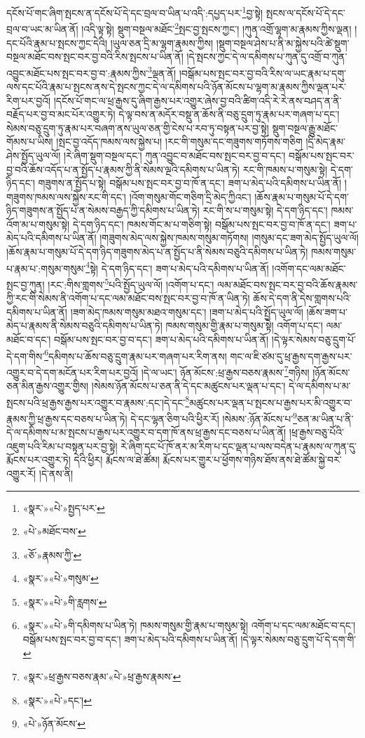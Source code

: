 དངོས་པོ་གང་ཞིག་སྤངས་ན་དངོས་པོ་དེ་དང་བྲལ་བ་ཡིན་པ་འདི་:དཔྱད་པར་\footnote{«སྣར་»«པེ་»སྤྱད་པར་}བྱ་སྟེ། སྤངས་ལ་དངོས་པོ་དེ་དང་བྲལ་བ་ཡང་མ་ཡིན་ནོ། །འདི་ལྟ་སྟེ། སྡུག་བསྔལ་མཐོང་\footnote{«པེ་»མཐོང་བས་}སྤང་བྱ་སྤངས་ཀྱང་། །ཀུན་འགྲོ་ལྷག་མ་རྣམས་ཀྱིས་ལྡན། །དང་པོའི་རྣམ་པ་སྤངས་ཀྱང་དེའི། །ཡུལ་ཅན་དྲི་མ་ལྷག་རྣམས་ཀྱིས། །སྡུག་བསྔལ་ཤེས་པ་ནི་མ་སྐྱེས་པའི་ཚེ་སྡུག་བསྔལ་མཐོང་བས་སྤང་བར་བྱ་བའི་རིས་སྤངས་པ་ཡིན་ནོ། །དེ་སྤངས་ཀྱང་དེ་ལ་དམིགས་པ་ཀུན་དུ་འགྲོ་བ་ཀུན་འབྱུང་མཐོང་པས་སྤང་བར་བྱ་བ་:རྣམས་ཀྱིས་\footnote{«ཅོ་»རྣམས་ཀྱི་}ལྡན་ནོ། །བསྒོམ་པས་སྤང་བར་བྱ་བའི་རིས་ལ་ཡང་རྣམ་པ་དགུ་ལས་དང་པོའི་རྣམ་པ་སྤངས་ནས་དེ་སྤངས་ཀྱང་དེ་ལ་དམིགས་པའི་ཉོན་མོངས་པ་ལྷག་མ་རྣམས་ཀྱིས་ལྡན་པར་རིག་པར་བྱའོ། །དངོས་པོ་གང་ལ་ཕྲ་རྒྱས་དུ་ཞིག་རྒྱས་པར་འགྱུར་ཞེས་བྱ་བའི་ཚིག་འདི་རེ་རེ་ནས་བཤད་ན་ནི་བརྗོད་པར་བྱ་བ་མང་པོར་འགྱུར་ཏེ། དེ་ལྟ་བས་ན་མདོར་བསྡུ་ན་ཆོས་ནི་བཅུ་དྲུག་ཏུ་རྣམ་པར་གཞག་པ་དང་། སེམས་བཅུ་དྲུག་ཏུ་རྣམ་པར་བཞག་ནས་ཡུལ་ཅན་གྱི་ངེས་པ་རབ་ཏུ་བསྟན་པར་བྱ་སྟེ། སྡུག་བསྔལ་རྒྱུ་མཐོང་གོམས་པ་ཡིས། །སྤང་བྱ་འདོད་ཁམས་ལས་སྐྱེས་པ། །རང་གི་གསུམ་དང་གཟུགས་གཏོགས་གཅིག །དྲི་མེད་རྣམ་ཤེས་སྤྱོད་ཡུལ་ལོ། །རེ་ཞིག་སྡུག་བསྔལ་དང་། ཀུན་འབྱུང་བ་མཐོང་བས་སྤང་བར་བྱ་བ་དང་། བསྒོམ་པས་སྤང་བར་བྱ་བའི་ཆོས་འདོད་པ་ན་སྤྱོད་པ་རྣམས་ཀྱི་ནི་སེམས་ལྔའི་དམིགས་པ་ཡིན་ཏེ། རང་གི་ཁམས་པ་གསུམ་སྟེ། དེ་དག་ཉིད་དང་། གཟུགས་ན་སྤྱོད་པ་སྟེ། བསྒོམ་པས་སྤང་བར་བྱ་བ་ཁོ་ན་དང་། ཟག་པ་མེད་པའི་དམིགས་པ་ཡིན་ནོ། །གཟུགས་ཁམས་ལས་སྐྱེས་རང་གི་དང་། །འོག་གསུམ་གོང་གཅིག་དྲི་མེད་ཀྱིའང་། །ཆོས་རྣམ་པ་གསུམ་པོ་དེ་དག་ཉིད་གཟུགས་ན་སྤྱོད་པ་ན་སེམས་བརྒྱད་ཀྱི་དམིགས་པ་ཡིན་ཏེ། རང་གི་ས་པ་གསུམ་སྟེ། དེ་དག་ཉིད་དང་། ཁམས་འོག་མ་པ་གསུམ་སྟེ། དེ་དག་ཉིད་དང་། ཁམས་གོང་མ་པ་གཅིག་སྟེ། བསྒོམ་པས་སྤང་བར་བྱ་བ་ཁོ་ན་དང་། ཟག་པ་མེད་པའི་དམིགས་པ་ཡིན་ནོ། །གཟུགས་མེད་ལས་སྐྱེས་ཁམས་གསུམ་གཏོགས། །གསུམ་དང་ཟག་མེད་སྤྱོད་ཡུལ་ལོ། །ཆོས་རྣམ་པ་གསུམ་པོ་དེ་དག་ཉིད་གཟུགས་མེད་པ་ན་སྤྱོད་པ་ནི་སེམས་བཅུའི་དམིགས་པ་ཡིན་ཏེ། ཁམས་གསུམ་པ་རྣམ་པ་:གསུམ་གསུམ་\footnote{«སྣར་»«པེ་»གསུམ་}སྟེ། དེ་དག་ཉིད་དང་། ཟག་པ་མེད་པའི་དམིགས་པ་ཡིན་ནོ། །འགོག་དང་ལམ་མཐོང་སྤང་བྱ་ཀུན། །རང་:གིས་གླགས་\footnote{«སྣར་»«པེ་»གི་རླགས་}པའི་སྤྱོད་ཡུལ་ལོ། །འགོག་པ་དང་། ལམ་མཐོང་བས་སྤང་བར་བྱ་བའི་ཆོས་རྣམས་ཀྱི་རང་གི་སེམས་ནི་འགོག་པ་དང་ལམ་མཐོང་བས་སྤང་བར་བྱ་བ་ཁོ་ན་ཡིན་ཏེ། ཆོས་དེ་དག་ནི་དེས་གླགས་པའི་དམིགས་པ་ཡིན་ནོ། །ཟག་མེད་ཁམས་གསུམ་མཐའ་གསུམ་དང་། །ཟག་པ་མེད་པའི་སྤྱོད་ཡུལ་ལོ། །ཆོས་ཟག་པ་མེད་པ་རྣམས་ནི་སེམས་བཅུའི་དམིགས་པ་ཡིན་ཏེ། ཁམས་གསུམ་གྱི་རྣམ་པ་གསུམ་སྟེ། འགོག་པ་དང་། ལམ་མཐོང་བ་དང་། བསྒོམ་པས་སྤང་བར་བྱ་བ་དང་། ཟག་པ་མེད་པའི་དམིགས་པ་ཡིན་ནོ། །དེ་ལྟར་སེམས་བཅུ་དྲུག་པོ་དེ་དག་གིས་\footnote{«སྣར་»«པེ་»གི་དམིགས་པ་ཡིན་ཏེ། ཁམས་གསུམ་གྱི་རྣམ་པ་གསུམ་སྟེ། འགོག་པ་དང་ལམ་མཐོང་བ་དང་། བསྒོམ་པས་སྤང་བར་བྱ་བ་དང་། ཟག་པ་མེད་པའི་དམིགས་པ་ཡིན་ནོ། །དེ་ལྟར་སེམས་བཅུ་དྲུག་པོ་དེ་དག་གི་}དམིགས་པ་ཆོས་བཅུ་དྲུག་རྣམ་པར་གཞག་པར་རིག་ནས། གང་ལ་ཇི་ཙམ་དུ་ཕྲ་རྒྱས་དག་རྒྱས་པར་འགྱུར་བ་དེ་དག་མངོན་པར་རིག་པར་བྱའོ། །དེ་ལ་ཡང་། ཉོན་མོངས་:ཕྲ་རྒྱས་བཅས་རྣམས་\footnote{«སྣར་»ཕྲ་རྒྱས་བཅས་རྣམ་«པེ་»ཕྲ་རྒྱས་རྣམས་}གཉིས། །ཉོན་མོངས་ཅན་མིན་རྒྱས་འགྱུར་གྱིས། །སེམས་ཉོན་མོངས་པ་ཅན་ནི་དེ་དང་མཚུངས་པར་ལྡན་པ་དང་། དེ་ལ་དམིགས་པ་མ་སྤངས་པའི་ཕྲ་རྒྱས་རྒྱས་པར་འགྱུར་བ་རྣམས་:དང་།དེ་དང་\footnote{«སྣར་»«པེ་»དང་།}མཚུངས་པར་ལྡན་པ་སྤངས་པ་རྒྱས་པར་མི་འགྱུར་བ་རྣམས་ཀྱི་ཕྲ་རྒྱས་དང་བཅས་པ་ཡིན་ཏེ། དེ་དང་ལྷན་ཅིག་པའི་ཕྱིར་རོ། །སེམས་:ཉོན་མོངས་པ་\footnote{«པེ་»ཉོན་མོངས་}ཅན་མ་ཡིན་པ་ནི་དེ་ལ་དམིགས་པ་མ་སྤངས་པ་རྒྱས་པར་འགྱུར་བ་དག་ཁོ་ནས་ཕྲ་རྒྱས་དང་བཅས་པ་ཡིན་ནོ། །ཕྲ་རྒྱས་བཅུ་པོའི་འཇུག་པའི་རིམ་པ་བསྟན་པར་བྱ་སྟེ། རེ་ཞིག་དང་པོ་ཁོ་ནར་མ་རིག་པ་དང་ལྡན་པ་ལས་བདེན་པ་རྣམས་ལ་ཀུན་དུ་རྨོངས་པར་འགྱུར་ཏེ། དེའི་ཕྱིར། རྨོངས་ལ་ཐེ་ཚོམ། རྨོངས་པར་གྱུར་པ་ཕྱོགས་གཉིས་ཐོས་ནས་ཐེ་ཚོམ་སྐྱེ་བར་འགྱུར་རོ། །དེ་ནས་ནི། 